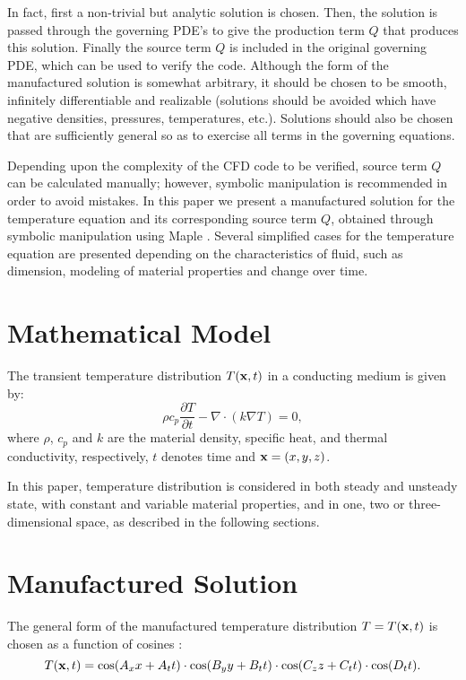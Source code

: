 \documentclass[a4paper,10pt]{article}
\newcommand{\D}{\partial}
\begin{document}
In fact, first a non-trivial but analytic solution is chosen. Then, the solution is passed through the governing PDE’s to give the production term $Q$ that produces this solution. Finally the source term $Q$ is included in the original governing PDE, which can be used to verify the code. Although the form of the manufactured solution is somewhat arbitrary, it should be chosen to be smooth, infinitely differentiable and realizable (solutions should be avoided which have negative densities, pressures, temperatures, etc.)\cite{Roy2004}. Solutions should also be chosen that are sufficiently general so as to exercise all terms in the governing equations.

Depending upon the complexity of the CFD code to be verified, source term $Q$ can be calculated manually; however,
symbolic manipulation is recommended in order to avoid mistakes. In this paper we present a manufactured solution for
the temperature equation and its corresponding source term $Q$, obtained through symbolic manipulation using
Maple \cite{Maple}. Several simplified cases for the temperature equation are presented depending on the characteristics of fluid, such as dimension, modeling of material properties and change over time.


\section{Mathematical Model}
The transient temperature distribution $T({\bf x},t)$ in a conducting medium is given by:
\begin{equation}
 \label{eq:temp}
\rho c_p \frac{\D T}{\D t} - \nabla \cdot (k \nabla T) = 0,
\end{equation}
where $\rho$, $c_p$ and $k$ are the material density, specific heat, and thermal conductivity, respectively,
$t$ denotes time and ${\bf x}=(x,y,z)$.

In this paper, temperature distribution is considered in both steady and unsteady state, with constant and variable material
properties, and in one, two or three-dimensional space, as described in the following sections.

\section{Manufactured Solution}

The general form of the manufactured temperature distribution $T = T ({\bf x}, t)$ is chosen as a
function of cosines \cite{Kirk2009}:
\begin{equation}
 \label{eq:manufactured01}
  T ({\bf x}, t) = \cos(A_x x + A_t t) \cdot \cos(B_y y + B_t t) \cdot \cos(C_z z + C_t t) \cdot \cos(D_t t) .
\end{equation}
\end{document}
